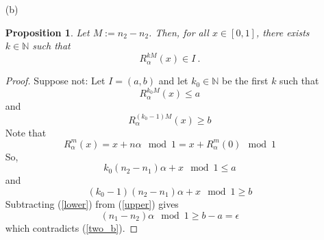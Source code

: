 \documentclass[12pt, reqno]{amsart}
\newtheorem{prop}{Proposition}[section]
\theoremstyle{definition}
\theoremstyle{remark}
\newcommand{\ud}{\mathrm{d}}
\begin{document}
\begin{itemize}
\begin{itemize}

\begin{figure}[htbp]
\end{figure}
\vspace{0.1 cm}
\item[(b)] 

\begin{prop}
    Let $M:= n_2-n_2$. Then, for all $x\in[0,1]$, there exists $k\in \mathbb{N}$ such that 
    \begin{equation}\label{two_b}
        R_\alpha^{kM}(x) \in I ~\mbox{.}
    \end{equation}
\end{prop}

\begin{proof}
    Suppose not: Let $I=(a,b)$ and let $k_{0}\in \mathbb{N}$ be the first $k$ such that $$R^{k_{0}M}_{\alpha}(x)\le a$$and $$R^{(k_{0}-1)M}_{\alpha}(x)\ge b$$
Note that $$R_{\alpha}^{m}(x)=x+n \alpha\mod1=x+R^{m}_{\alpha}(0)\mod1$$
    So, 
    \begin{equation} \label{upper}
        k_{0}(n_{2}-n_{1})\alpha+x\mod1\le a 
    \end{equation}
    and 
    \begin{equation}\label{lower}
        (k_{0}-1)(n_{2}-n_{1})\alpha+x\mod1\ge b
    \end{equation}
    Subtracting (\ref{lower}) from (\ref{upper}) gives $$(n_{1}-n_{2})\alpha\mod1\ge b-a=\epsilon$$
which contradicts (\ref{two_b}).
\end{proof}



\end{itemize}
\end{itemize}
\end{document}
